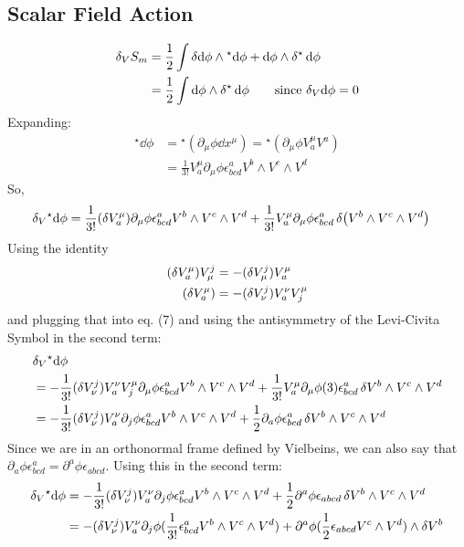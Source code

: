 \documentclass[12pt]{article}
\newcommand{\hodge}{{^\star}}
\begin{document}
\subsection{Scalar Field Action}
\begin{align}
  \var_V{S_m} &= \frac{1}{2} \int \var\dd\phi \wedge \hodge\dd\phi + \dd\phi \wedge \var\hodge\dd\phi \nonumber \\
  &=  \frac{1}{2} \int \dd\phi \wedge \var\hodge\dd\phi \qquad \text{since } \var_V\dd\phi = 0 
\end{align}
Expanding:
\begin{align*}
  \hodge\dd\phi &= \hodge(\partial_\mu\phi \dd x^\mu) = \hodge(\partial_\mu\phi V^\mu_a V^a)\\ 
  &= \frac{1}{3!} V^\mu_a \partial_\mu\phi \epsilon^a_{bcd}V^b \wedge V^c \wedge V^d
\end{align*}
So,
\begin{align}
  \var_V\hodge\dd\phi &= \frac{1}{3!}(\var V^\mu_a)\partial_\mu\phi \epsilon^a_{bcd} V^b \wedge V^c \wedge V^d + \frac{1}{3!} V^\mu_a \partial_\mu\phi \epsilon^a_{bcd}\var(V^b \wedge V^c \wedge V^d)
\end{align}
Using the identity
\begin{align*}
  (\var V^\mu_a)V^j_\mu &= -(\var V^j_\mu)V^\mu_a \\
  (\var V^\mu_a) &= -(\var V^j_\nu)V^\nu_a V_j^\mu
\end{align*}
and plugging that into eq. (7) and using the antisymmetry of the Levi-Civita Symbol in the second term:
\begin{align*}
  &\var_V\hodge\dd\phi \\ &= -\frac{1}{3!}(\var V^j_\nu)V^\nu_a V_j^\mu \partial_\mu\phi \epsilon^a_{bcd}V^b \wedge V^c \wedge V^d + \frac{1}{3!} V^\mu_a \partial_\mu\phi (3)\epsilon^a_{bcd}\var{V^b} \wedge V^c \wedge V^d \\
  &= -\frac{1}{3!}(\var V^j_\nu)V^\nu_a \partial_j\phi \epsilon^a_{bcd}V^b \wedge V^c \wedge V^d + \frac{1}{2} \partial_a\phi \epsilon^a_{bcd}\var{V^b} \wedge V^c \wedge V^d
\end{align*}
Since we are in an orthonormal frame defined by Vielbeins, we can also say that $\partial_a\phi \epsilon^a_{bcd} = \partial^a\phi \epsilon_{abcd}$. Using this in the second term:
\begin{align*}
  \var_V\hodge\dd\phi &= -\frac{1}{3!}(\var V^j_\nu)V^\nu_a \partial_j\phi \epsilon^a_{bcd}V^b \wedge V^c \wedge V^d + \frac{1}{2} \partial^a\phi \epsilon_{abcd}\var{V^b} \wedge V^c \wedge V^d \\
  &= -(\var V^j_\nu)V^\nu_a \partial_j\phi (\frac{1}{3!} \epsilon^a_{bcd}V^b \wedge V^c \wedge V^d) + \partial^a\phi (\frac{1}{2} \epsilon_{abcd} V^c \wedge V^d) \wedge \var{V^b}
\end{align*}
\end{document}
